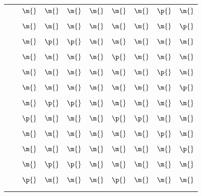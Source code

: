\documentclass[11pt,oneside,a4paper]{article}
\begin{document}
\begin{table}[H]
{\begin{tabular}[]{p{3.1cm} p{3.5cm}| p{0.4cm} p{0.4cm} p{0.4cm} p{0.4cm} p{0.4cm} | p{0.4cm} | p{0.4cm} p{0.4cm}}
				\makecell{\multirow{4}{*}{\makecell{$idle$}}}
				& \makecell{$outputManipState$} &$\m{}$&$\m{}$&$\m{}$&$\m{}$&$\m{}$&$\m{}$&$\p{}$&$\m{}$\\
				&&&&&&&&\\[-6pt]
				& \makecell{$outputMotorCon$} &$\m{}$&$\m{}$&$\m{}$&$\m{}$&$\m{}$&$\m{}$&$\m{}$&$\p{}$\\	
				&&&&&&&&\\[-6pt]
				& \makecell{$calculatePosition$} &$\m{}$&$\p{}$&$\p{}$&$\m{}$&$\m{}$&$\m{}$&$\m{}$&$\m{}$\\	
				&&&&&&&&\\[-6pt]
				& \makecell{$passiveRegulation$} &$\m{}$&$\m{}$&$\m{}$&$\m{}$&$\p{}$&$\m{}$&$\m{}$&$\m{}$\\ 
				\hline
				&&&&&&&&\\[-6pt]
				\makecell{\multirow{4}{*}{\makecell{$jointMove$}}}
				& \makecell{$outputManipState$} &$\m{}$&$\m{}$&$\m{}$&$\m{}$&$\m{}$&$\m{}$&$\p{}$&$\m{}$\\
				&&&&&&&&\\[-6pt]
				& \makecell{$outputMotorCon$} &$\m{}$&$\m{}$&$\m{}$&$\m{}$&$\m{}$&$\m{}$&$\m{}$&$\p{}$\\
				&&&&&&&&\\[-6pt]
				& \makecell{$calculatePosition$} &$\m{}$&$\p{}$&$\p{}$&$\m{}$&$\m{}$&$\m{}$&$\m{}$&$\m{}$\\
				&&&&&&&&\\[-6pt]
				& \makecell{$jointMove$} &$\p{}$&$\m{}$&$\m{}$&$\m{}$&$\p{}$&$\p{}$&$\m{}$&$\m{}$\\ 	
				\hline
				&&&&&&&&\\[-6pt]
				\makecell{\multirow{4}{*}{\makecell{$operationalMove$}}}
				& \makecell{$outputManipState$} &$\m{}$&$\m{}$&$\m{}$&$\m{}$&$\m{}$&$\m{}$&$\p{}$&$\m{}$\\
				&&&&&&&&\\[-6pt]
				& \makecell{$outputMotorCon$} &$\m{}$&$\m{}$&$\m{}$&$\m{}$&$\m{}$&$\m{}$&$\m{}$&$\p{}$\\	
				&&&&&&&&\\[-6pt]
				& \makecell{$calculatePosition$} &$\m{}$&$\p{}$&$\p{}$&$\m{}$&$\m{}$&$\m{}$&$\m{}$&$\m{}$\\	
				&&&&&&&&\\[-6pt]
				& \makecell{$operationalMove$} &$\p{}$&$\m{}$&$\m{}$&$\m{}$&$\p{}$&$\m{}$&$\m{}$&$\m{}$\\	
				\hline
				&&&&&&&&\\[-6pt]
				\makecell{\multirow{4}{*}{\makecell{$emergencyStop$}}}

\end{tabular}}
\end{table}
\end{document}
